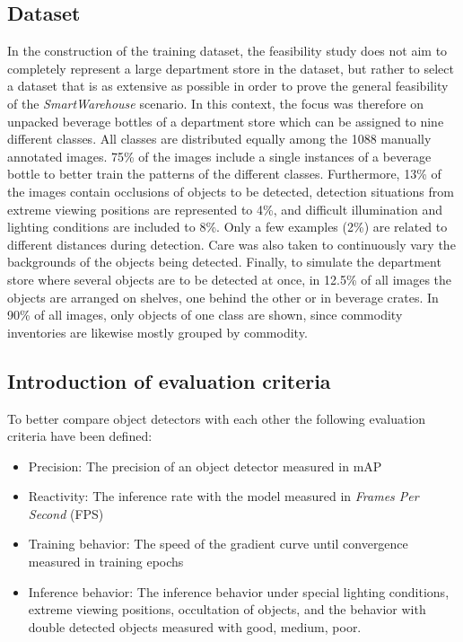 \documentclass[a4paper, 10pt, journal]{wissarbIEEE}      %
\begin{document}
\subsection{Dataset}

In the construction of the training dataset, the feasibility study does not aim to completely represent a large department store in the dataset, but rather to select a dataset that is as extensive as possible in order to prove the general feasibility of the \textit{SmartWarehouse} scenario. In this context, the focus was therefore on unpacked beverage bottles of a department store which can be assigned to nine different classes. All classes are distributed equally among the 1088 manually annotated images. 75\% of the images include a single instances of a beverage bottle to better train the patterns of the different classes. Furthermore, 13\% of the images contain occlusions of objects to be detected, detection situations from extreme viewing positions are represented to 4\%, and difficult illumination and lighting conditions are included to 8\%. Only a few examples (2\%) are related to different distances during detection. Care was also taken to continuously vary the backgrounds of the objects being detected. Finally, to simulate the department store where several objects are to be detected at once, in 12.5\% of all images the objects are arranged on shelves, one behind the other or in beverage crates. In 90\% of all images, only objects of one class are shown, since commodity inventories are likewise mostly grouped by commodity. 

\subsection{Introduction of evaluation criteria}

To better compare object detectors with each other the following evaluation criteria have been defined:

\begin{itemize}
	\item Precision: The precision of an object detector measured in mAP
	\item Reactivity: The inference rate with the model measured in \textit{Frames Per Second} (FPS)
	\item Training behavior: The speed of the gradient curve until convergence measured in training epochs
	\item Inference behavior: The inference behavior under special lighting conditions, extreme viewing positions, occultation of objects, and the behavior with double detected objects measured with good, medium, poor. 
\end{itemize}
\end{document}
